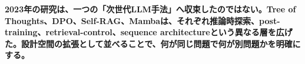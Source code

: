 \noindent\textbf{2023年の研究は、一つの「次世代LLM手法」へ収束したのではない。Tree of Thoughts、DPO、Self-RAG、Mambaは、それぞれ推論時探索、post-training、retrieval-control、sequence architectureという異なる層を広げた。設計空間の拡張として並べることで、何が同じ問題で何が別問題かを明確にする。}\autocite{src-21aef0026892,src-5dd64e15cc75,src-8a38211129c4,src-e413c7ab8da4}
